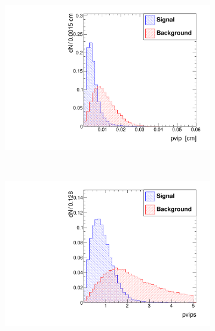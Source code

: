 \documentclass[10pt,a4paper]{article}
\begin{document}
\begin{figure}
        \begin{subfigure}[b]{0.2\textwidth}
                \centering
                \includegraphics[width=\textwidth]{Figures/pvip_barrel}
                \label{fig:pvipBarrel}
        \end{subfigure}
        ~
        \begin{subfigure}[b]{0.2\textwidth}
                \centering
                \includegraphics[width=\textwidth]{Figures/pvips_barrel}
                \label{fig:pvipsBarrel}
        \end{subfigure}
        ~
        \begin{subfigure}[b]{0.2\textwidth}
                \centering

\end{subfigure}
\end{figure}
\end{document}
